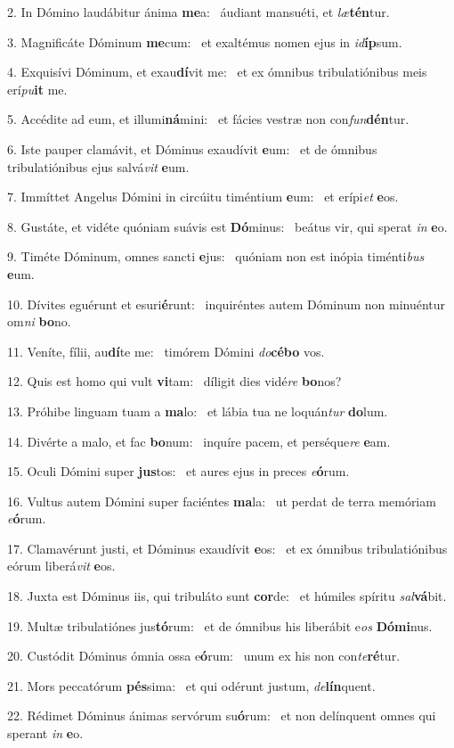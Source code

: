 2. In Dómino laudábitur ánima \textbf{me}a: \ast\  áudiant mansuéti, et \textit{læ}\textbf{tén}tur.\

3. Magnificáte Dóminum \textbf{me}cum: \ast\  et exaltémus nomen ejus in \textit{id}\textbf{íp}sum.\

4. Exquisívi Dóminum, et exau\textbf{dí}vit me: \ast\  et ex ómnibus tribulatiónibus meis erí\textit{pu}\textbf{it} me.\

5. Accédite ad eum, et illumi\textbf{ná}mini: \ast\  et fácies vestræ non con\textit{fun}\textbf{dén}tur.\

6. Iste pauper clamávit, et Dóminus exaudívit \textbf{e}um: \ast\  et de ómnibus tribulatiónibus ejus salvá\textit{vit} \textbf{e}um.\

7. Immíttet Angelus Dómini in circúitu timéntium \textbf{e}um: \ast\  et erípi\textit{et} \textbf{e}os.\

8. Gustáte, et vidéte quóniam suávis est \textbf{Dó}minus: \ast\  beátus vir, qui sperat \textit{in} \textbf{e}o.\

9. Timéte Dóminum, omnes sancti \textbf{e}jus: \ast\  quóniam non est inópia timénti\textit{bus} \textbf{e}um.\

10. Dívites eguérunt et esuri\textbf{é}runt: \ast\  inquiréntes autem Dóminum non minuéntur om\textit{ni} \textbf{bo}no.\

11. Veníte, fílii, au\textbf{dí}te me: \ast\  timórem Dómini \textit{do}\textbf{cé}\textbf{bo} vos.\

12. Quis est homo qui vult \textbf{vi}tam: \ast\  díligit dies vidé\textit{re} \textbf{bo}nos?\

13. Próhibe linguam tuam a \textbf{ma}lo: \ast\  et lábia tua ne loquán\textit{tur} \textbf{do}lum.\

14. Divérte a malo, et fac \textbf{bo}num: \ast\  inquíre pacem, et perséque\textit{re} \textbf{e}am.\

15. Oculi Dómini super \textbf{jus}tos: \ast\  et aures ejus in preces \textit{e}\textbf{ó}rum.\

16. Vultus autem Dómini super faciéntes \textbf{ma}la: \ast\  ut perdat de terra memóriam \textit{e}\textbf{ó}rum.\

17. Clamavérunt justi, et Dóminus exaudívit \textbf{e}os: \ast\  et ex ómnibus tribulatiónibus eórum liberá\textit{vit} \textbf{e}os.\

18. Juxta est Dóminus iis, qui tribuláto sunt \textbf{cor}de: \ast\  et húmiles spíritu \textit{sal}\textbf{vá}bit.\

19. Multæ tribulatiónes jus\textbf{tó}rum: \ast\  et de ómnibus his liberábit e\textit{os} \textbf{Dó}\textbf{mi}nus.\

20. Custódit Dóminus ómnia ossa e\textbf{ó}rum: \ast\  unum ex his non con\textit{te}\textbf{ré}tur.\

21. Mors peccatórum \textbf{pés}sima: \ast\  et qui odérunt justum, \textit{de}\textbf{lín}quent.\

22. Rédimet Dóminus ánimas servórum su\textbf{ó}rum: \ast\  et non delínquent omnes qui sperant \textit{in} \textbf{e}o.\

